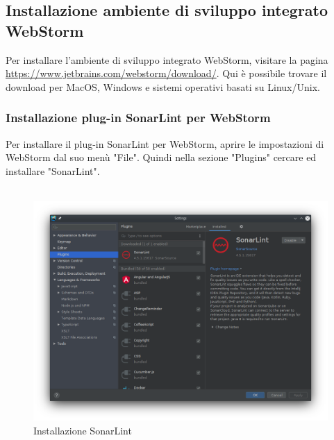 \pagebreak
\subsection{Installazione ambiente di sviluppo integrato WebStorm}
Per installare l'ambiente di sviluppo integrato WebStorm, visitare la pagina \url{https://www.jetbrains.com/webstorm/download/}. Qui è possibile trovare il download per MacOS, Windows e sistemi operativi basati su Linux/Unix.
\\

\subsubsection{Installazione plug-in SonarLint per WebStorm}
Per installare il plug-in SonarLint per WebStorm, aprire le impostazioni di WebStorm dal suo menù "File". Quindi nella sezione "Plugins" cercare ed installare "SonarLint".
\\
\\
\begin{figure}[H] 	
	\begin{center}
		\includegraphics[width=\textwidth,height=\textheight,keepaspectratio]{img/sonarlint.png}
	\end{center}
	\caption{Installazione SonarLint}	
\end{figure}

